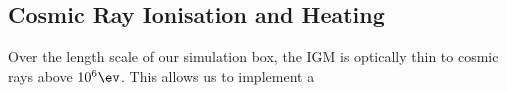 \subsection{Cosmic Ray Ionisation and Heating}
\label{CRchem}
Over the length scale of our simulation box, the IGM is optically thin to cosmic rays above $10^6\ev$. This allows us to implement a 